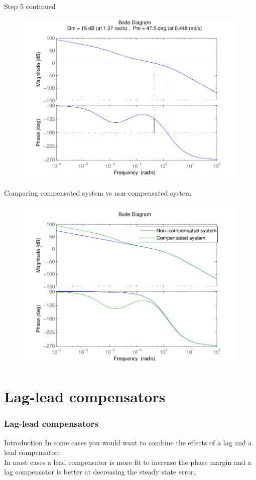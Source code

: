 \begin{frame}
\begin{exampleblock}{Step 5 continued}
\begin{figure}
	\centering
	\includegraphics[width=0.6
	\linewidth]{lagstep5better}
\end{figure}
\end{exampleblock}
\end{frame}

\begin{frame}
\begin{exampleblock}{Comparing compensated system vs non-compensated system}
\begin{figure}
	\centering
	\includegraphics[width=0.6
	\linewidth]{lagcomparingbetter}
\end{figure}
\end{exampleblock}
\end{frame}



\section{Lag-lead compensators}

\begin{frame}
\frametitle{Lag-lead compensators}
\begin{block}{Introduction}
	In some cases you would want to combine the effects of a lag and a lead compensator:\\
		In most cases a lead compensator is more fit to increase the phase margin and a lag compensator is better at 	decreasing the steady state error.
\end{block}
\end{frame}

